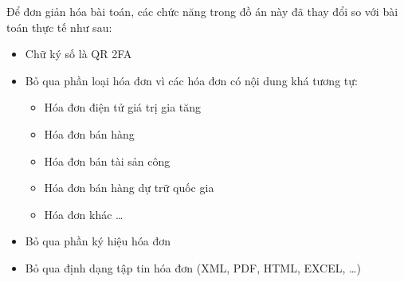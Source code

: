 Để đơn giản hóa bài toán, các chức năng trong đồ án này đã thay đổi so với bài toán thực tế như sau:

\begin{itemize}

\item Chữ ký số là QR 2FA





\item Bỏ qua phần loại hóa đơn vì các hóa đơn có nội dung khá tương tự:

\begin{itemize}

\item Hóa đơn điện tử giá trị gia tăng

\item Hóa đơn bán hàng

\item Hóa đơn bán tài sản công

\item Hóa đơn bán hàng dự trữ quốc gia

\item Hóa đơn khác \dots

\end{itemize}

\item Bỏ qua phần ký hiệu hóa đơn





\item Bỏ qua định dạng tập tin hóa đơn (XML, PDF, HTML, EXCEL, \dots)

\end{itemize}